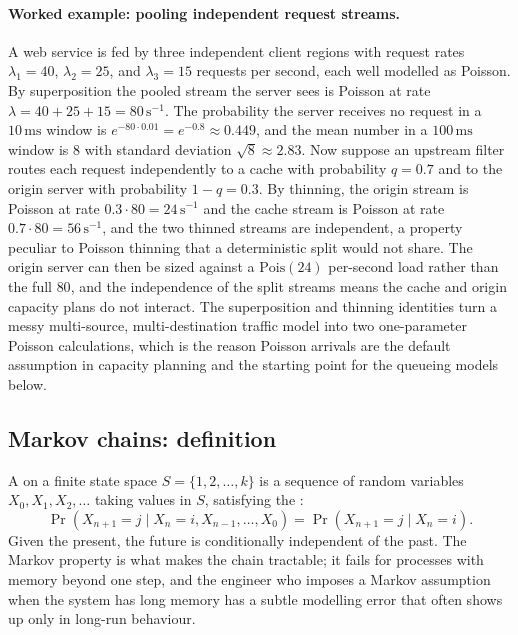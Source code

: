 \paragraph{Worked example: pooling independent request streams.} A web
service is fed by three independent client regions with request rates
$\lambda_{1} = 40$, $\lambda_{2} = 25$, and $\lambda_{3} = 15$ requests
per second, each well modelled as Poisson. By superposition the pooled
stream the server sees is Poisson at rate $\lambda = 40 + 25 + 15 =
80\,\text{s}^{-1}$. The probability the server receives no request in a
$10\,\text{ms}$ window is $e^{-80 \cdot 0.01} = e^{-0.8} \approx 0.449$,
and the mean number in a $100\,\text{ms}$ window is $8$ with standard
deviation $\sqrt{8} \approx 2.83$. Now suppose an upstream filter routes
each request independently to a cache with probability $q = 0.7$ and to
the origin server with probability $1 - q = 0.3$. By thinning, the origin
stream is Poisson at rate $0.3 \cdot 80 = 24\,\text{s}^{-1}$ and the
cache stream is Poisson at rate $0.7 \cdot 80 = 56\,\text{s}^{-1}$, and
the two thinned streams are independent, a property peculiar to Poisson
thinning that a deterministic split would not share. The origin server
can then be sized against a $\mathrm{Pois}(24)$ per-second load rather
than the full $80$, and the independence of the split streams means the
cache and origin capacity plans do not interact. The superposition and
thinning identities turn a messy multi-source, multi-destination traffic
model into two one-parameter Poisson calculations, which is the reason
Poisson arrivals are the default assumption in capacity planning and the
starting point for the queueing models below.

\subsection{Markov chains: definition}

A  on a finite state space
$S = \{1, 2, \ldots, k\}$ is a sequence of random variables
$X_{0}, X_{1}, X_{2}, \ldots$ taking values in $S$, satisfying the
:
\[
\Pr(X_{n+1} = j \mid X_{n} = i, X_{n-1}, \ldots, X_{0})
= \Pr(X_{n+1} = j \mid X_{n} = i).
\]
Given the present, the future is conditionally independent of the
past. The Markov property is what makes the chain tractable; it
fails for processes with memory beyond one step, and the engineer
who imposes a Markov assumption when the system has long memory
has a subtle modelling error that often shows up only in long-run
behaviour.

